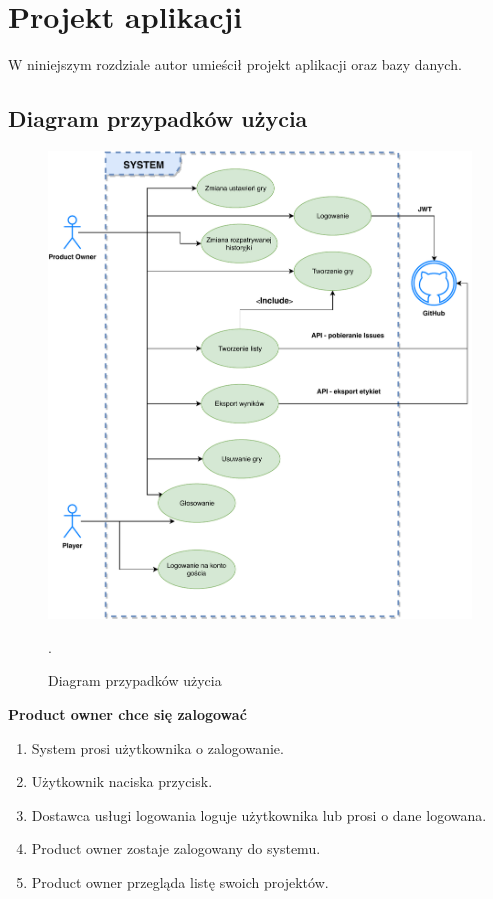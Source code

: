 \chapter{Projekt aplikacji}

W niniejszym rozdziale autor umieścił projekt aplikacji oraz bazy danych.

\section{Diagram przypadków użycia}

\begin{figure}[H]
	\centering\includegraphics[width=.9\textwidth]{img/useCase}
	\caption{Diagram przypadków użycia}.
	\label{rys:useCase}
\end{figure}

\textbf{Product owner chce się zalogować}

\begin{enumerate}
    \item System prosi użytkownika o zalogowanie.
    \item Użytkownik naciska przycisk.
    \item Dostawca usługi logowania loguje użytkownika lub prosi o dane logowana.
    \item Product owner zostaje zalogowany do systemu.
    \item Product owner przegląda listę swoich projektów.
\end{enumerate}

